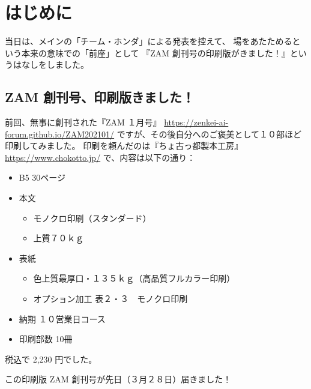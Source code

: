 \documentclass[dvipdfmx,autodetect-engine,10pt,b5paper,papersize,openany,dvipsnames]{jsbook}
\begin{document}
\chapter{はじめに}
\label{ch:zenza}
\thispagestyle{fancy}

当日は、メインの「チーム・ホンダ」による発表を控えて、
場をあたためるという本来の意味での「前座」として
『ZAM 創刊号の印刷版がきました！』というはなしをしました。

\begin{multicols}{2}

\section*{ZAM 創刊号、印刷版きました！}
前回、無事に創刊された『ZAM １月号』
\url{https://zenkei-ai-forum.github.io/ZAM202101/}
ですが、その後自分へのご褒美として１０部ほど印刷してみました。
印刷を頼んだのは『ちょ古っ都製本工房』
\url{https://www.chokotto.jp/}
で、内容は以下の通り：
{\small
\begin{itemize}
  \item B5 30ページ
  \item 本文
  \begin{itemize}
    \item モノクロ印刷（スタンダード）
    \item 上質７０ｋｇ
  \end{itemize}
  \item 表紙
  \begin{itemize}
    \item 色上質最厚口・１３５ｋｇ（高品質フルカラー印刷）
    \item オプション加工 表２・３　モノクロ印刷
  \end{itemize}
  \item 納期 １０営業日コース
  \item 印刷部数 10冊
\end{itemize}
}
税込で 2,230 円でした。

この印刷版 ZAM 創刊号が先日（３月２８日）届きました！




\end{multicols}
\end{document}
